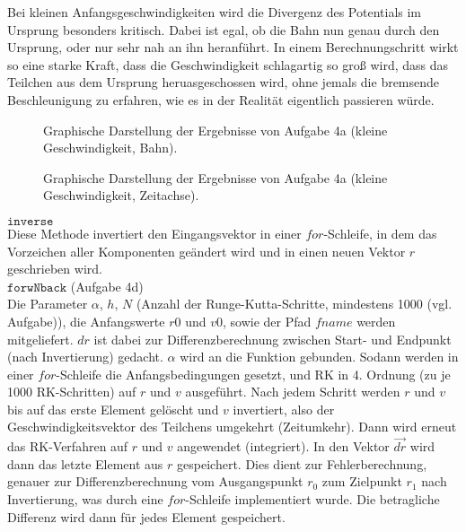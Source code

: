 Bei kleinen Anfangsgeschwindigkeiten wird die Divergenz des Potentials im Ursprung besonders
kritisch. Dabei ist egal, ob die Bahn nun genau durch den Ursprung, oder nur sehr nah an ihn
heranführt. In einem Berechnungschritt wirkt so eine starke Kraft, dass die Geschwindigkeit
schlagartig so groß wird, dass das Teilchen aus dem Ursprung heruasgeschossen wird, ohne jemals die
bremsende Beschleunigung zu erfahren, wie es in der Realität eigentlich passieren würde. 

\begin{landscape}
	\begin{figure}
		\caption{Graphische Darstellung der Ergebnisse von Aufgabe 4a (kleine Geschwindigkeit, Bahn).}
		\label{fig:4aklvBahn}
	\end{figure}
\end{landscape} 

\begin{landscape}
	\begin{figure}
		\caption{Graphische Darstellung der Ergebnisse von Aufgabe 4a (kleine Geschwindigkeit, Zeitachse).}
		\label{fig:4aklvZeit}
	\end{figure}
\end{landscape} 
	
	$\texttt{inverse}$\\
Diese Methode invertiert den Eingangsvektor in einer $\textit{for}$-Schleife, in dem das Vorzeichen aller Komponenten geändert wird und in einen neuen Vektor $r$ geschrieben wird.\\
	
	$\texttt{forwNback}$ (Aufgabe 4d)\\
Die Parameter $\alpha$, $h$, $N$ (Anzahl der Runge-Kutta-Schritte, mindestens 1000 (vgl. Aufgabe)), die Anfangswerte $r0$ und $v0$, sowie der Pfad $\textit{fname}$ werden mitgeliefert. $dr$ ist dabei zur Differenzberechnung zwischen Start- und Endpunkt (nach Invertierung) gedacht. $\alpha$ wird an die Funktion gebunden. Sodann werden in einer $\textit{for}$-Schleife die Anfangsbedingungen gesetzt, und RK in 4. Ordnung (zu je 1000 RK-Schritten) auf $r$ und $v$ ausgeführt. Nach jedem Schritt werden $r$ und $v$ bis auf das erste Element gelöscht und $v$ invertiert, also der Geschwindigkeitsvektor des Teilchens umgekehrt (Zeitumkehr). Dann wird erneut das RK-Verfahren auf $r$ und $v$ angewendet (integriert). In den Vektor $\vec{dr}$ wird dann das letzte Element aus $r$ gespeichert. Dies dient zur Fehlerberechnung, genauer zur Differenzberechnung vom Ausgangspunkt $r_0$ zum Zielpunkt $r_1$ nach Invertierung, was durch eine $\textit{for}$-Schleife implementiert wurde. Die betragliche Differenz wird dann für jedes Element gespeichert.\\

